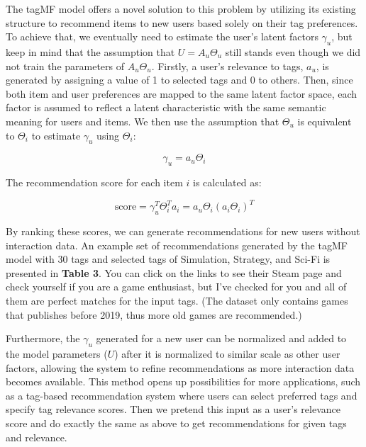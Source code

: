 \documentclass[sigplan,screen]{acmart}
\begin{document}
The tagMF model offers a novel solution to this problem by utilizing its existing structure to recommend items to new users based solely on their tag preferences. To achieve that, we eventually need to estimate the user's latent factors $\gamma_u$, but keep in mind that the assumption that $U = A_u\Theta_u$  still stands even though we did not train the parameters of $A_u\Theta_u$. Firstly, a user's relevance to tags, \(a_u\), is generated by assigning a value of 1 to selected tags and 0 to others. Then, since both item and user preferences are mapped to the same latent factor space, each factor is assumed to reflect a latent characteristic with the same semantic meaning for users and items\cite{Koren09, LOEPP201921, Donkers16}. We then use the assumption that \(\Theta_u\) is equivalent to \(\Theta_i\) to estimate \(\gamma_u\) using \(\Theta_i\):

\begin{equation}
 \gamma_u = a_u \Theta_i
\end{equation}

The recommendation score for each item \(i\) is calculated as:

\begin{equation}
\text{score} = \gamma_u^T\Theta_i^Ta_i = a_u\Theta_i(a_i\Theta_i)^T
\end{equation}

By ranking these scores, we can generate recommendations for new users without interaction data. An example set of recommendations generated by the tagMF model with 30 tags and selected tags of Simulation, Strategy, and Sci-Fi is presented in \textbf{Table 3}. You can click on the links to see their Steam page and check yourself if you are a game enthusiast, but I've checked for you and all of them are perfect matches for the input tags. (The dataset only contains games that publishes before 2019, thus more old games are recommended.)

Furthermore, the \(\gamma_u\) generated for a new user can be normalized and added to the model parameters (\(U\)) after it is normalized to similar scale as other user factors, allowing the system to refine recommendations as more interaction data becomes available. This method opens up possibilities for more applications, such as a tag-based recommendation system where users can select preferred tags and specify tag relevance scores. Then we pretend this input as a user's relevance score and do exactly the same as above to get recommendations for given tags and relevance.
\end{document}
